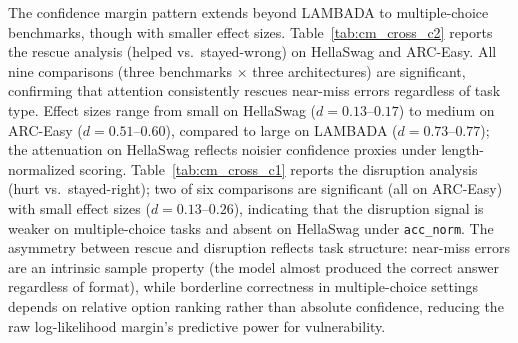The confidence margin pattern extends beyond LAMBADA to multiple-choice benchmarks, though with smaller effect sizes. Table~\ref{tab:cm_cross_c2} reports the rescue analysis (helped vs.\ stayed-wrong) on HellaSwag and ARC-Easy. All nine comparisons (three benchmarks $\times$ three architectures) are significant, confirming that attention consistently rescues near-miss errors regardless of task type. Effect sizes range from small on HellaSwag ($d = 0.13$--$0.17$) to medium on ARC-Easy ($d = 0.51$--$0.60$), compared to large on LAMBADA ($d = 0.73$--$0.77$); the attenuation on HellaSwag reflects noisier confidence proxies under length-normalized scoring. Table~\ref{tab:cm_cross_c1} reports the disruption analysis (hurt vs.\ stayed-right); two of six comparisons are significant (all on ARC-Easy) with small effect sizes ($d = 0.13$--$0.26$), indicating that the disruption signal is weaker on multiple-choice tasks and absent on HellaSwag under \texttt{acc\_norm}. The asymmetry between rescue and disruption reflects task structure: near-miss errors are an intrinsic sample property (the model almost produced the correct answer regardless of format), while borderline correctness in multiple-choice settings depends on relative option ranking rather than absolute confidence, reducing the raw log-likelihood margin's predictive power for vulnerability.

\begin{table}[ht]
\centering
\caption{Cross-benchmark rescue analysis (Control 2): helped vs.\ stayed-wrong on HellaSwag and ARC-Easy (1.3B h3-1).}
\label{tab:cm_cross_c2}
\end{table}

